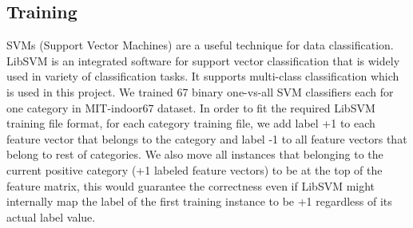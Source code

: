 \subsection{Training}
SVMs (Support Vector Machines) are a useful technique for data classification.
LibSVM\cite{Chang:2011:CC01a} is an integrated software for support vector
classification that is widely used in variety of classification tasks.
It supports multi-class classification which is used in this project.
We trained 67 binary one-vs-all SVM classifiers each for one category in
MIT-indoor67 dataset.
In order to fit the required LibSVM training file format, for each category
training file, we add label +1 to each feature vector that belongs to the
category and label -1 to all feature vectors that belong to rest of categories.
We also move all instances that belonging to the current positive category
(+1 labeled feature vectors) to be at the top of the feature matrix, this would
guarantee the correctness even if LibSVM might internally map the label of the
first training instance to be +1 regardless of its actual label value.
